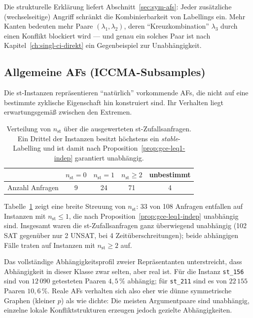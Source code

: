 Die strukturelle Erkl\"arung liefert Abschnitt~\ref{sec:sym-afs}: Jeder
zus\"atzliche (wechselseitige) Angriff schr\"ankt die Kombinierbarkeit von
Labellings ein. Mehr Kanten bedeuten mehr Paare \((\lambda_1,\lambda_2)\),
deren \enquote{Kreuzkombination} \(\lambda_3\) durch einen Konflikt blockiert
wird --- und genau ein solches Paar ist nach
Kapitel~\ref{ch:singl-ci-direkt} ein Gegenbeispiel zur Unabh\"angigkeit.

\subsection{Allgemeine AFs (ICCMA-Subsamples)}
\label{subsec:gce-st}

Die st-Instanzen repr\"asentieren \enquote{nat\"urlich} vorkommende AFs, die
nicht auf eine bestimmte zyklische Eigenschaft hin konstruiert sind. Ihr
Verhalten liegt erwartungsgem\"a\ss{} zwischen den Extremen.

\begin{table}[htbp]
    \myfloatalign
    \begin{tabularx}{\textwidth}{Xcccc} \toprule
        & \(n_{\mathrm{st}}=0\) & \(n_{\mathrm{st}}=1\) &
          \(n_{\mathrm{st}}\geq2\) & unbestimmt \\ \midrule
        Anzahl Anfragen & 9 & 24 & 71 & 4 \\
        \bottomrule
    \end{tabularx}
    \caption[Stabile Labellings in st-Instanzen]{Verteilung von
    \(n_{\mathrm{st}}\) \"uber die ausgewerteten st-Zufallsanfragen. Ein Drittel
    der Instanzen besitzt h\"ochstens ein \textit{stable}-Labelling und ist
    damit nach Proposition~\ref{prop:gce-leq1-indep} garantiert unabh\"angig.}
    \label{tab:gce-st}
\end{table}

Tabelle~\ref{tab:gce-st} zeigt eine breite Streuung von \(n_{\mathrm{st}}\):
33 von 108 Anfragen entfallen auf Instanzen mit \(n_{\mathrm{st}}\leq 1\), die
nach Proposition~\ref{prop:gce-leq1-indep} unabh\"angig sind. Insgesamt waren
die st-Zufallsanfragen ganz \"uberwiegend unabh\"angig (102 SAT gegen\"uber nur
2 UNSAT, bei 4 Zeit\"uberschreitungen); beide abh\"angigen F\"alle traten auf
Instanzen mit \(n_{\mathrm{st}}\geq2\) auf.

Das vollst\"andige Abh\"angigkeitsprofil zweier Repr\"asentanten unterstreicht,
dass Abh\"angigkeit in dieser Klasse zwar selten, aber real ist. F\"ur die
Instanz \texttt{st\_156} sind von \(12\,090\) getesteten Paaren \(4{,}5\,\%\)
abh\"angig; f\"ur \texttt{st\_211} sind es von \(22\,155\) Paaren
\(10{,}6\,\%\). Reale AFs verhalten sich also eher wie d\"unne symmetrische
Graphen (kleiner \(p\)) als wie dichte: Die meisten Argumentpaare sind
unabh\"angig, einzelne lokale Konfliktstrukturen erzeugen jedoch gezielte
Abh\"angigkeiten.

